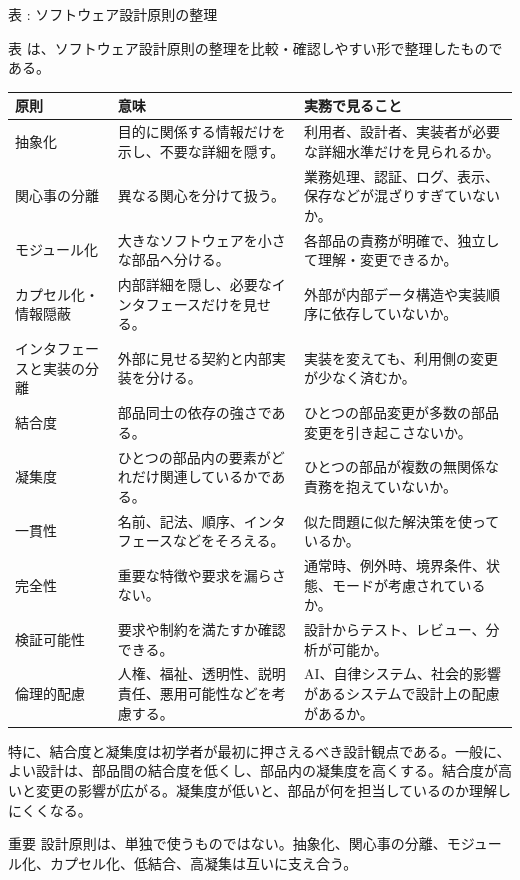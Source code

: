 \par\smallskip\noindent{}\label{tab:ch03-03}表 \thetable: ソフトウェア設計原則の整理\par\smallskip
表 \thetable は、ソフトウェア設計原則の整理を比較・確認しやすい形で整理したものである。\par\smallskip
\begin{longtable}{L{34mm}L{55mm}L{76mm}}
\toprule
原則 & 意味 & 実務で見ること \\
\midrule
\endhead
抽象化 & 目的に関係する情報だけを示し、不要な詳細を隠す。 & 利用者、設計者、実装者が必要な詳細水準だけを見られるか。 \\
関心事の分離 & 異なる関心を分けて扱う。 & 業務処理、認証、ログ、表示、保存などが混ざりすぎていないか。 \\
モジュール化 & 大きなソフトウェアを小さな部品へ分ける。 & 各部品の責務が明確で、独立して理解・変更できるか。 \\
カプセル化・情報隠蔽 & 内部詳細を隠し、必要なインタフェースだけを見せる。 & 外部が内部データ構造や実装順序に依存していないか。 \\
インタフェースと実装の分離 & 外部に見せる契約と内部実装を分ける。 & 実装を変えても、利用側の変更が少なく済むか。 \\
結合度 & 部品同士の依存の強さである。 & ひとつの部品変更が多数の部品変更を引き起こさないか。 \\
凝集度 & ひとつの部品内の要素がどれだけ関連しているかである。 & ひとつの部品が複数の無関係な責務を抱えていないか。 \\
一貫性 & 名前、記法、順序、インタフェースなどをそろえる。 & 似た問題に似た解決策を使っているか。 \\
完全性 & 重要な特徴や要求を漏らさない。 & 通常時、例外時、境界条件、状態、モードが考慮されているか。 \\
検証可能性 & 要求や制約を満たすか確認できる。 & 設計からテスト、レビュー、分析が可能か。 \\
倫理的配慮 & 人権、福祉、透明性、説明責任、悪用可能性などを考慮する。 & AI、自律システム、社会的影響があるシステムで設計上の配慮があるか。 \\
\bottomrule
\end{longtable}

特に、結合度と凝集度は初学者が最初に押さえるべき設計観点である。一般に、よい設計は、部品間の結合度を低くし、部品内の凝集度を高くする。結合度が高いと変更の影響が広がる。凝集度が低いと、部品が何を担当しているのか理解しにくくなる。

\begin{pointbox}{重要}
設計原則は、単独で使うものではない。抽象化、関心事の分離、モジュール化、カプセル化、低結合、高凝集は互いに支え合う。
\end{pointbox}

